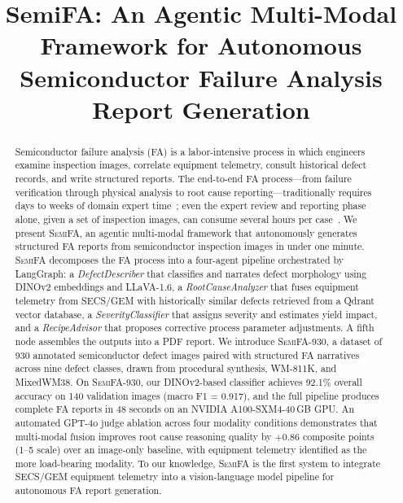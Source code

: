 \documentclass[conference]{IEEEtran}
\newcommand{\semifa}{\textsc{SemiFA}}
\newcommand{\semidataset}{\textsc{SemiFA-930}}
\begin{document}
\title{SemiFA: An Agentic Multi-Modal Framework for Autonomous Semiconductor Failure Analysis Report Generation}

\author{
}

\maketitle

\begin{abstract}
Semiconductor failure analysis (FA) is a labor-intensive process in which engineers examine inspection images, correlate equipment telemetry, consult historical defect records, and write structured reports.
The end-to-end FA process---from failure verification through physical analysis to root cause reporting---traditionally requires days to weeks of domain expert time~\cite{infinitalab2023fa,azom2023fab}; even the expert review and reporting phase alone, given a set of inspection images, can consume several hours per case~\cite{kla2023klarity,amat2023actionable}.
We present \semifa{}, an agentic multi-modal framework that autonomously generates structured FA reports from semiconductor inspection images in under one minute.
\semifa{} decomposes the FA process into a four-agent pipeline orchestrated by LangGraph: a \textit{DefectDescriber} that classifies and narrates defect morphology using DINOv2 embeddings and LLaVA-1.6, a \textit{RootCauseAnalyzer} that fuses equipment telemetry from SECS/GEM with historically similar defects retrieved from a Qdrant vector database, a \textit{SeverityClassifier} that assigns severity and estimates yield impact, and a \textit{RecipeAdvisor} that proposes corrective process parameter adjustments.
A fifth node assembles the outputs into a PDF report.
We introduce \semidataset{}, a dataset of 930 annotated semiconductor defect images paired with structured FA narratives across nine defect classes, drawn from procedural synthesis, WM-811K, and MixedWM38.
On \semidataset{}, our DINOv2-based classifier achieves 92.1\% overall accuracy on 140 validation images (macro F1 = 0.917), and the full pipeline produces complete FA reports in 48 seconds on an NVIDIA A100-SXM4-40\,GB GPU.
An automated GPT-4o judge ablation across four modality conditions demonstrates that multi-modal fusion improves root cause reasoning quality by $+$0.86 composite points (1--5 scale) over an image-only baseline, with equipment telemetry identified as the more load-bearing modality.
To our knowledge, \semifa{} is the first system to integrate SECS/GEM equipment telemetry into a vision-language model pipeline for autonomous FA report generation.
\end{abstract}
\end{document}
